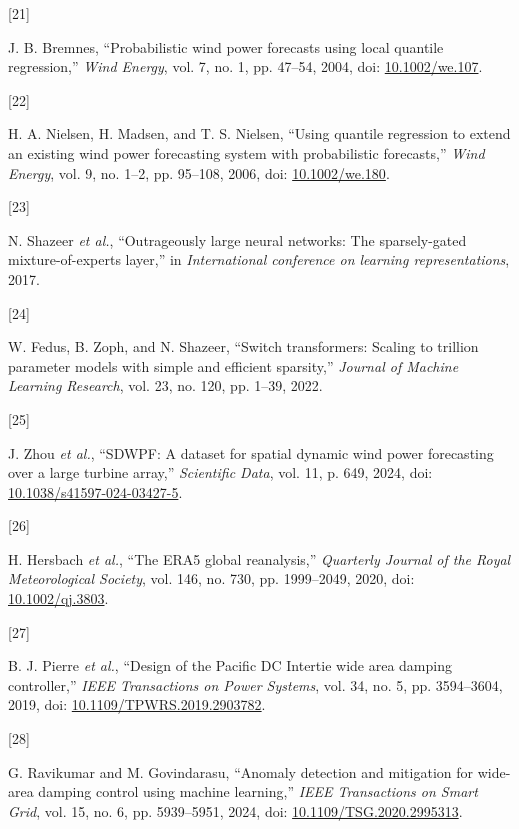 \documentclass[
  journal]{IEEEtran}
\newlength{\cslhangindent}
\newlength{\csllabelwidth}
\newenvironment{CSLReferences}[2] %
 {\begin{list}{}{%
  \setlength{\itemindent}{0pt}
  \setlength{\leftmargin}{0pt}
  \setlength{\parsep}{0pt}
  \ifodd #1
   \setlength{\leftmargin}{\cslhangindent}
   \setlength{\itemindent}{-1\cslhangindent}
  \fi
  \setlength{\itemsep}{#2\baselineskip}}}
 {\end{list}}
\newcommand{\CSLLeftMargin}[1]{\parbox[t]{\csllabelwidth}{\strut#1\strut}}
\newcommand{\CSLRightInline}[1]{\parbox[t]{\linewidth - \csllabelwidth}{\strut#1\strut}}
\begin{document}
\begin{CSLReferences}{0}{0}
\CSLLeftMargin{{[}21{]} }%
\CSLRightInline{J. B. Bremnes, {``Probabilistic wind power forecasts
using local quantile regression,''} \emph{Wind Energy}, vol. 7, no. 1,
pp. 47--54, 2004, doi:
\href{https://doi.org/10.1002/we.107}{10.1002/we.107}.}

\CSLLeftMargin{{[}22{]} }%
\CSLRightInline{H. A. Nielsen, H. Madsen, and T. S. Nielsen, {``Using
quantile regression to extend an existing wind power forecasting system
with probabilistic forecasts,''} \emph{Wind Energy}, vol. 9, no. 1--2,
pp. 95--108, 2006, doi:
\href{https://doi.org/10.1002/we.180}{10.1002/we.180}.}

\CSLLeftMargin{{[}23{]} }%
\CSLRightInline{N. Shazeer \emph{et al.}, {``Outrageously large neural
networks: The sparsely-gated mixture-of-experts layer,''} in
\emph{International conference on learning representations}, 2017.}

\CSLLeftMargin{{[}24{]} }%
\CSLRightInline{W. Fedus, B. Zoph, and N. Shazeer, {``Switch
transformers: Scaling to trillion parameter models with simple and
efficient sparsity,''} \emph{Journal of Machine Learning Research}, vol.
23, no. 120, pp. 1--39, 2022.}

\CSLLeftMargin{{[}25{]} }%
\CSLRightInline{J. Zhou \emph{et al.}, {``SDWPF: A dataset for spatial
dynamic wind power forecasting over a large turbine array,''}
\emph{Scientific Data}, vol. 11, p. 649, 2024, doi:
\href{https://doi.org/10.1038/s41597-024-03427-5}{10.1038/s41597-024-03427-5}.}

\CSLLeftMargin{{[}26{]} }%
\CSLRightInline{H. Hersbach \emph{et al.}, {``The {ERA5} global
reanalysis,''} \emph{Quarterly Journal of the Royal Meteorological
Society}, vol. 146, no. 730, pp. 1999--2049, 2020, doi:
\href{https://doi.org/10.1002/qj.3803}{10.1002/qj.3803}.}

\CSLLeftMargin{{[}27{]} }%
\CSLRightInline{B. J. Pierre \emph{et al.}, {``Design of the {Pacific DC
Intertie} wide area damping controller,''} \emph{IEEE Transactions on
Power Systems}, vol. 34, no. 5, pp. 3594--3604, 2019, doi:
\href{https://doi.org/10.1109/TPWRS.2019.2903782}{10.1109/TPWRS.2019.2903782}.}

\CSLLeftMargin{{[}28{]} }%
\CSLRightInline{G. Ravikumar and M. Govindarasu, {``Anomaly detection
and mitigation for wide-area damping control using machine learning,''}
\emph{IEEE Transactions on Smart Grid}, vol. 15, no. 6, pp. 5939--5951,
2024, doi:
\href{https://doi.org/10.1109/TSG.2020.2995313}{10.1109/TSG.2020.2995313}.}

\end{CSLReferences}
\end{document}
